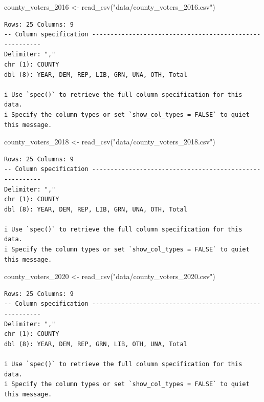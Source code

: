\documentclass[
  letterpaper,
  DIV=11,
  numbers=noendperiod]{scrreprt}
\newenvironment{Shaded}{\begin{snugshade}}{\end{snugshade}}
\newcommand{\FunctionTok}[1]{\textcolor[rgb]{0.28,0.35,0.67}{#1}}
\newcommand{\NormalTok}[1]{\textcolor[rgb]{0.00,0.23,0.31}{#1}}
\newcommand{\OtherTok}[1]{\textcolor[rgb]{0.00,0.23,0.31}{#1}}
\newcommand{\StringTok}[1]{\textcolor[rgb]{0.13,0.47,0.30}{#1}}
\begin{document}
\begin{Shaded}
\begin{Highlighting}[]
\NormalTok{county\_voters\_2016 }\OtherTok{\textless{}{-}} \FunctionTok{read\_csv}\NormalTok{(}\StringTok{"data/county\_voters\_2016.csv"}\NormalTok{)}
\end{Highlighting}
\end{Shaded}

\begin{verbatim}
Rows: 25 Columns: 9
-- Column specification --------------------------------------------------------
Delimiter: ","
chr (1): COUNTY
dbl (8): YEAR, DEM, REP, LIB, GRN, UNA, OTH, Total

i Use `spec()` to retrieve the full column specification for this data.
i Specify the column types or set `show_col_types = FALSE` to quiet this message.
\end{verbatim}

\begin{Shaded}
\begin{Highlighting}[]
\NormalTok{county\_voters\_2018 }\OtherTok{\textless{}{-}} \FunctionTok{read\_csv}\NormalTok{(}\StringTok{"data/county\_voters\_2018.csv"}\NormalTok{)}
\end{Highlighting}
\end{Shaded}

\begin{verbatim}
Rows: 25 Columns: 9
-- Column specification --------------------------------------------------------
Delimiter: ","
chr (1): COUNTY
dbl (8): YEAR, DEM, REP, LIB, GRN, UNA, OTH, Total

i Use `spec()` to retrieve the full column specification for this data.
i Specify the column types or set `show_col_types = FALSE` to quiet this message.
\end{verbatim}

\begin{Shaded}
\begin{Highlighting}[]
\NormalTok{county\_voters\_2020 }\OtherTok{\textless{}{-}} \FunctionTok{read\_csv}\NormalTok{(}\StringTok{"data/county\_voters\_2020.csv"}\NormalTok{)}
\end{Highlighting}
\end{Shaded}

\begin{verbatim}
Rows: 25 Columns: 9
-- Column specification --------------------------------------------------------
Delimiter: ","
chr (1): COUNTY
dbl (8): YEAR, DEM, REP, GRN, LIB, OTH, UNA, Total

i Use `spec()` to retrieve the full column specification for this data.
i Specify the column types or set `show_col_types = FALSE` to quiet this message.
\end{verbatim}
\end{document}

